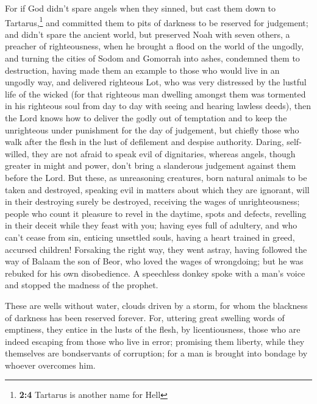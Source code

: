  For if God didn't spare angels when they sinned, but cast
them down to Tartarus,\footnote{\textbf{2:4} Tartarus is another name
  for Hell} and committed them to pits of darkness to be reserved for
judgement;  and didn't spare the ancient world, but
preserved Noah with seven others, a preacher of righteousness, when he
brought a flood on the world of the ungodly,  and turning
the cities of Sodom and Gomorrah into ashes, condemned them to
destruction, having made them an example to those who would live in an
ungodly way,  and delivered righteous Lot, who was very
distressed by the lustful life of the wicked  (for that
righteous man dwelling amongst them was tormented in his righteous soul
from day to day with seeing and hearing lawless deeds), 
then the Lord knows how to deliver the godly out of temptation and to
keep the unrighteous under punishment for the day of judgement,
 but chiefly those who walk after the flesh in the lust
of defilement and despise authority. Daring, self-willed, they are not
afraid to speak evil of dignitaries,  whereas angels,
though greater in might and power, don't bring a slanderous judgement
against them before the Lord.  But these, as unreasoning
creatures, born natural animals to be taken and destroyed, speaking evil
in matters about which they are ignorant, will in their destroying
surely be destroyed,  receiving the wages of
unrighteousness; people who count it pleasure to revel in the daytime,
spots and defects, revelling in their deceit while they feast with you;
 having eyes full of adultery, and who can't cease from
sin, enticing unsettled souls, having a heart trained in greed, accursed
children!  Forsaking the right way, they went astray,
having followed the way of Balaam the son of Beor, who loved the wages
of wrongdoing;  but he was rebuked for his own
disobedience. A speechless donkey spoke with a man's voice and stopped
the madness of the prophet.

 These are wells without water, clouds driven by a storm,
for whom the blackness of darkness has been reserved forever.
 For, uttering great swelling words of emptiness, they
entice in the lusts of the flesh, by licentiousness, those who are
indeed escaping from those who live in error;  promising
them liberty, while they themselves are bondservants of corruption; for
a man is brought into bondage by whoever overcomes him.

